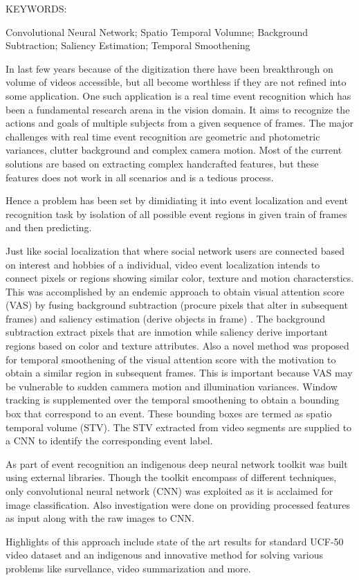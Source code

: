 \abstract

\noindent KEYWORDS: \hspace*{0.5em} \parbox[t]{4.4in}{Convolutional Neural Network; Spatio Temporal Volumne; Background Subtraction; Saliency Estimation; Temporal Smoothening}

\vspace*{24pt}
In last few years because of the digitization there have been breakthrough on volume of videos accessible, but all become worthless if they are not refined into some application. One such application is a real time event recognition which has been a fundamental research arena in the vision domain. It aims to recognize the actions and goals of multiple subjects from a given sequence of frames. The major challenges with real time event recognition are geometric and photometric variances, clutter background and complex camera motion. Most of the current solutions are based on extracting complex handcrafted features, but these features does not work in all scenarios and is a tedious process. 

\par Hence a problem has been set by dimidiating it into event localization and event recognition task by isolation of all possible event regions in given train of frames and then predicting. 

\par Just like social localization that where social network users are connected based on interest and hobbies of a individual, video event localization intends to connect pixels or regions showing similar color, texture and motion characterstics.  This was accomplished by an endemic approach to obtain visual attention score (VAS) by fusing background subtraction (procure pixels that alter in subsequent frames) and saliency estimation (derive objects in frame) . The background subtraction extract pixels that are inmotion while saliency  derive important regions based on color and texture attributes. Also a  novel method was proposed for temporal smoothening of the visual attention score  with the motivation to obtain a similar region in subsequent frames. This is important because VAS may be vulnerable to sudden cammera motion and illumination variances.  Window tracking is supplemented over the temporal smoothening to obtain a bounding box that correspond to an event. These bounding boxes are termed as spatio temporal volume (STV). The STV extracted from video segments are supplied to a CNN to identify the corresponding event label.

\par As part of event recognition an indigenous deep neural network toolkit was built using external libraries. Though the toolkit encompass of different techniques, only convolutional neural network (CNN) was exploited as it is acclaimed for image classification. Also investigation were done on providing  processed features as input along with the raw images to CNN.

\par Highlights of this approach include state of the art results for standard UCF-50 video dataset and an indigenous and innovative method for solving various problems like survellance, video summarization and more.  
\pagebreak